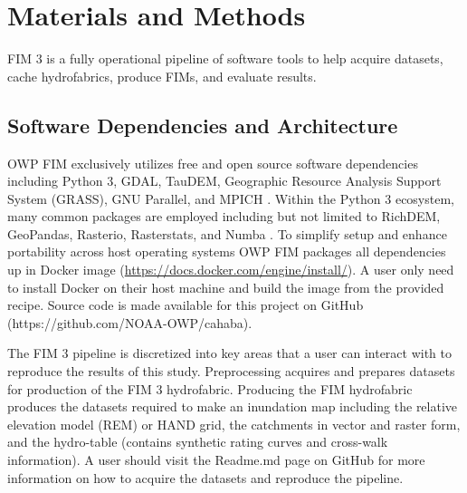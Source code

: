 
\section{Materials and Methods}
%
FIM 3 is a fully operational pipeline of software tools to help acquire datasets, cache hydrofabrics, produce FIMs, and evaluate results.
%
\subsection{Software Dependencies and Architecture}
%
OWP FIM exclusively utilizes free and open source software dependencies including Python 3, GDAL, TauDEM, Geographic Resource Analysis Support System (GRASS), GNU Parallel, and MPICH \cite{python382,gdal2020,tarboton2005terrain,grass2020,tange2015gnu,amer2021mpich}.
Within the Python 3 ecosystem, many common packages are employed including but not limited to RichDEM, GeoPandas, Rasterio, Rasterstats, and Numba \cite{barnes2018richdem,jordahl2014geopandas,lam2015numba}. 
To simplify setup and enhance portability across host operating systems OWP FIM packages all dependencies up in Docker image (\url{https://docs.docker.com/engine/install/}). 
A user only need to install Docker on their host machine and build the image from the provided recipe. 
Source code is made available for this project on GitHub (https://github.com/NOAA-OWP/cahaba). 

The FIM 3 pipeline is discretized into key areas that a user can interact with to reproduce the results of this study. Preprocessing acquires and prepares datasets for production of the FIM 3 hydrofabric. 
Producing the FIM hydrofabric produces the datasets required to make an inundation map including the relative elevation model (REM) or HAND grid, the catchments in vector and raster form, and the hydro-table (contains synthetic rating curves and cross-walk information).
A user should visit the Readme.md page on GitHub for more information on how to acquire the datasets and reproduce the pipeline.
%
